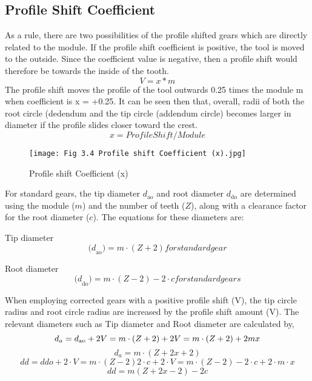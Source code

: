 \documentclass{article}
\begin{document}
\subsection{Profile Shift Coefficient}
As a rule, there are two possibilities of the profile shifted gears which are directly related to the module. If the profile shift coefficient is positive, the tool is moved to the outside. Since the coefficient value is negative, then a profile shift would therefore be towards the inside of the tooth.
\begin{equation}
    V = x*m
\end{equation}
The profile shift moves the profile of the tool outwards 0.25 times the module m when coefficient is x = +0.25. It can be seen then that, overall, radii of both the root circle (dedendum and the tip circle (addendum circle) becomes larger in diameter if the profile slides closer toward the crest.
\begin{equation}
   x = {Profile Shift}/{Module} 
\end{equation}
\begin{figure}[h]
    \centering
    \texttt{[image: Fig 3.4 Profile shift Coefficient (x).jpg]}
    \caption{ Profile shift Coefficient (x) \cite{Profileshift-of-Involute-Gears5}}
    \label{fig:enter-label}
\end{figure}
For standard gears, the tip diameter \( d_{\mathrm{ao}} \) and root diameter \( d_{\mathrm{do}} \) are determined using the module (\( m \)) and the number of teeth (\( Z \)), along with a clearance factor for the root diameter (\( c \)). The equations for these diameters are:

Tip diameter \begin{equation}
    {(d}_{\mathrm{ao}})=m\cdot\left(Z+2\right) for standard gear
\end{equation}

Root diameter \begin{equation}
    {(d}_{\mathrm{do}})=m\cdot\left(Z-2\right)-2\cdot c for standard gears
\end{equation}

When employing corrected gears with a positive profile shift (V), the tip circle radius and root circle radius are increased by the profile shift amount (V). The relevant diameters such as Tip diameter and Root diameter are calculated by,
\begin{equation}
    d_a = d_{\mathrm{ao}} + 2V = m \cdot (Z+2) + 2V = m \cdot (Z+2) + 2mx \\
\end{equation}
\begin{equation}
     d_a = m \cdot (Z+2x+2)
\end{equation}
\begin{equation}
    dd = ddo + 2·V = m·(Z-2)  2·c + 2·V = m·(Z-2) - 2·c + 2·m·x
\end{equation}
\begin{equation}
    dd = m(Z + 2x - 2) - 2c
\end{equation}
\end{document}
